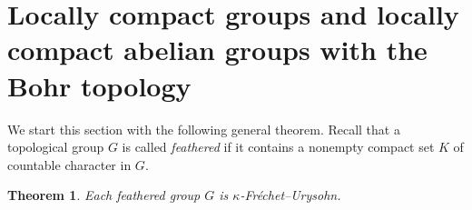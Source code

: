 \documentclass[preprint,11pt]{elsarticle}
\def\dag-{$\kappa$-pseudo open }
\newtheorem{theorem}{Theorem}[section]
\numberwithin{equation}{section}
\numberwithin{theorem}{section}
\begin{document}











\section{Locally compact groups and locally compact abelian groups with the Bohr topology} \label{sec:LCG-LCA-Bohr}


We start this section with the following general theorem. Recall that a topological group $G$ is called {\em feathered} if it contains a nonempty compact set $K$ of countable character in $G$.


\begin{theorem} \label{t:feathered-group-kFU}
Each feathered group $G$ is $\kappa$-Fr\'{e}chet--Urysohn.
\end{theorem}
\end{document}
